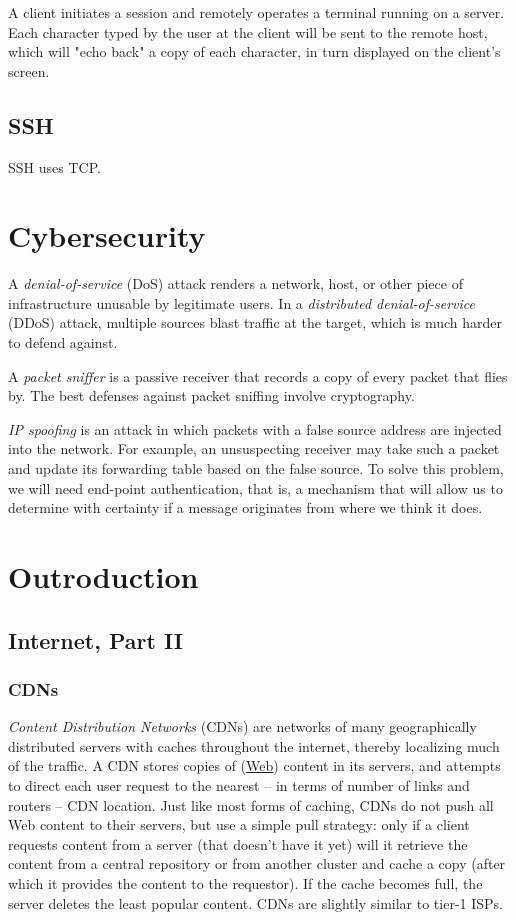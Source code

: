 \documentclass[table, xcdraw]{article}%
\begin{document}
A client initiates a session and remotely operates a terminal running on a server. Each character typed by the user at the client will be sent to the remote host, which will "echo back" a copy of each character, in turn displayed on the client's screen.

\subsection{SSH} \label{ssh}

SSH uses TCP.

\section{Cybersecurity} \label{ch:cybersecurity}

A \emph{denial-of-service} (DoS) attack renders a network, host, or other piece of infrastructure unusable by legitimate users. In a \emph{distributed denial-of-service} (DDoS) attack, multiple sources blast traffic at the target, which is much harder to defend against.

A \emph{packet sniffer} is a passive receiver that records a copy of every packet that flies by. The best defenses against packet sniffing
involve cryptography.

\emph{IP spoofing} is an attack in which packets with a false source address are injected into the network. For example, an unsuspecting receiver may take such a packet and update its forwarding table based on the false source. To solve this problem, we will need end-point authentication, that is, a mechanism that will allow us to determine with certainty if a message originates from where we think it does.

\section{Outroduction} \label{ch:outro}

\subsection{Internet, Part II}

\subsubsection{CDNs}

\emph{Content Distribution Networks} (CDNs) are networks of many geographically distributed servers with caches throughout the internet, thereby localizing much of the traffic. A CDN stores copies of (\hyperref[HTTP]{Web}) content in its servers, and attempts to direct each user request to the nearest -- in terms of number of links and routers -- CDN location. Just like most forms of caching, CDNs do not push all Web content to their servers, but use a simple pull strategy: only if a client requests content from a server (that doesn't have it yet) will it retrieve the content from a central repository or from another cluster and cache a copy (after which it provides the content to the requestor). If the cache becomes full, the server deletes the least popular content. CDNs are slightly similar to tier-1 ISPs.
\end{document}
